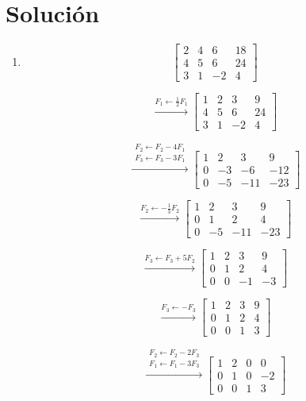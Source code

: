 \documentclass[12pt,letterpaper]{article}
\begin{document}
\newpage
\section*{Solución}

\begin{enumerate}

\item 

\[
\left[
\begin{array}{ccc|c}
2 & 4 & 6 & 18 \\
4 & 5 & 6 & 24 \\
3 & 1 & -2 & 4
\end{array}
\right]
\]

\[
\xrightarrow{F_1 \leftarrow \frac12 F_1}
\left[
\begin{array}{ccc|c}
1 & 2 & 3 & 9 \\
4 & 5 & 6 & 24 \\
3 & 1 & -2 & 4
\end{array}
\right]
\]

\[
\xrightarrow{\substack{F_2 \leftarrow F_2 - 4F_1\\ F_3 \leftarrow F_3 - 3F_1}}
\left[
\begin{array}{ccc|c}
1 & 2 & 3 & 9 \\
0 & -3 & -6 & -12 \\
0 & -5 & -11 & -23
\end{array}
\right]
\]

\[
\xrightarrow{F_2 \leftarrow -\frac13 F_2}
\left[
\begin{array}{ccc|c}
1 & 2 & 3 & 9 \\
0 & 1 & 2 & 4 \\
0 & -5 & -11 & -23
\end{array}
\right]
\]

\[
\xrightarrow{F_3 \leftarrow F_3 + 5F_2}
\left[
\begin{array}{ccc|c}
1 & 2 & 3 & 9 \\
0 & 1 & 2 & 4 \\
0 & 0 & -1 & -3
\end{array}
\right]
\]

\[
\xrightarrow{F_3 \leftarrow -F_3}
\left[
\begin{array}{ccc|c}
1 & 2 & 3 & 9 \\
0 & 1 & 2 & 4 \\
0 & 0 & 1 & 3
\end{array}
\right]
\]

\[
\xrightarrow{\substack{F_2 \leftarrow F_2 - 2F_3\\ F_1 \leftarrow F_1 - 3F_3}}
\left[
\begin{array}{ccc|c}
1 & 2 & 0 & 0 \\
0 & 1 & 0 & -2 \\
0 & 0 & 1 & 3
\end{array}
\right]
\]


\end{enumerate}
\end{document}
